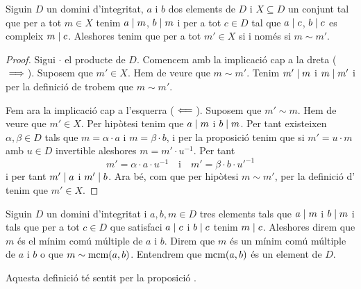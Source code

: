 \documentclass[../../Main.tex]{subfiles}
\begin{document}
	\begin{proposition}
		\label{prop:mínim comú múltiple anells}
		Siguin \(D\) un domini d'integritat, \(a\) i \(b\) dos elements de \(D\) i \(X\subseteq D\) un conjunt tal que per a tot \(m\in X\) tenim \(a\mathrel{|} m\), \(b\mathrel{|} m\) i per a tot \(c\in D\) tal que \(a\mathrel{|} c\), \(b\mathrel{|} c\) es compleix \(m\mathrel{|} c\). Aleshores tenim que per a tot \(m'\in X\) si i només si \(m\sim m'\).
		\begin{proof}
			Sigui \(\cdot\) el producte de \(D\). Comencem amb la implicació cap a la dreta (\(\implies\)). Suposem que \(m'\in X\). Hem de veure que \(m\sim m'\). Tenim \(m'\mathrel{|} m\) i \(m\mathrel{|} m'\) i per la definició de  trobem que \(m\sim m'\). %
			
			Fem ara la implicació cap a l'esquerra (\(\impliedby\)). Suposem que \(m'\sim m\). Hem de veure que \(m'\in X\). Per hipòtesi tenim que \(a\mathrel{|} m\) i \(b\mathrel{|} m\). Per tant existeixen \(\alpha,\beta\in D\) tals que \(m=\alpha\cdot a\) i \(m=\beta\cdot b\), i per la proposició  tenim que si \(m'=u\cdot m\) amb \(u\in D\) invertible aleshores \(m=m'\cdot u^{-1}\). Per tant
			\[m'=\alpha\cdot a\cdot u^{-1}\quad\text{i}\quad m'=\beta\cdot b\cdot{u'}^{-1}\]
			i per tant \(m'\mathrel{|} a\) i \(m'\mathrel{|} b\). Ara bé, com que per hipòtesi \(m\sim m'\), per la definició d' tenim que \(m'\in X\). %
		\end{proof}
	\end{proposition}
	\begin{definition}
		\label{def:mínim comú múltiple anells}
		\label{def:mcm anells}
		Siguin \(D\) un domini d'integritat i \(a,b,m\in D\) tres elements tals que \(a\mathrel{|} m\) i \(b\mathrel{|} m\) i tals que per a tot \(c\in D\) que satisfaci \(a\mathrel{|} c\) i \(b\mathrel{|} c\) tenim \(m\mathrel{|} c\). Aleshores direm que \(m\) és el mínim comú múltiple de \(a\) i \(b\). Direm que \(m\) és un mínim comú múltiple de \(a\) i \(b\) o que \(m\sim\operatorname{mcm}(a,b)\).
		Entendrem que \(\operatorname{mcm}(a,b)\) és un element de \(D\).
		
		Aquesta definició té sentit per la proposició .
	\end{definition}
\end{document}
